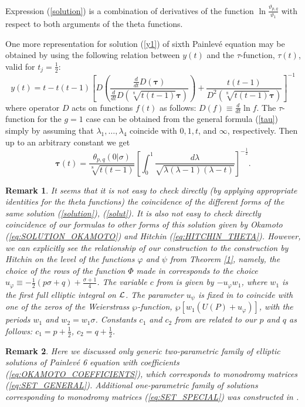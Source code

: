 \documentclass[11pt]{article}
\newtheorem{remark}{Remark}[section]
\def\be{\begin{equation}}
\def\ee{\end{equation}}
\def\ben{\begin{displaymath}}
\def\een{\end{displaymath}}
\def\l{\lambda}
\def\th{\vartheta}
\def\phi{\varphi}
\def\la{\label}
\def\f{\frac}
\def\L{{\cal L}}
\def\log{\ln}
\begin{document}
Expression (\ref{solution}) is a combination of derivatives of the function
$\log\f{\th_{p,q}}{\th_1}$ with respect to both arguments of the theta functions.

One more representation for solution (\ref{y1}) of sixth Painlev\'e equation may be obtained by using the following relation between $y(t)$ and the $\tau$-function, $\tau(t)$, valid for $t_j=\f12$:
\be
  y(t)=t-t(t-1)\left[D\left(\frac{\frac d{dt}D(\mathbf{\tau})}
  {\frac d{dt}D\left(\sqrt[8]{t(t-1)}\mathbf{\tau}\right)}\right)
+\frac{t(t-1)}{D^2\left(\sqrt[8]{t(t-1)}\mathbf{\tau}\right)}\right]^{-1}
\la{solut}
\ee
where operator $D$ acts on functions $f(t)$ as follows:
$D(f)\equiv\f{d}{dt}\log f$.
The $\tau$-function for the $g=1$ case can be obtained from the general formula
(\ref{tau}) simply by assuming that $\l_1,\dots,\l_4$ coincide with $0,1,t$, and $\infty$, respectively. Then up to an arbitrary constant we get
\ben
\mathbf{\tau}(t)=\f{\theta_{p,q}(0\vert\sigma)}{\sqrt[8]{t(t-1)}}
\left[\int_0^1\f{d\l}{\sqrt{\l(\l-1)(\l-t)}}\right]^{-\f12}.
\een
\begin{remark}\rm 
It seems that it is not easy to check directly (by applying appropriate identities for the theta functions) the coincidence of the different forms of the same solution
(\ref{solution}), (\ref{solut}). 
It is also not easy to check directly coincidence of our formulas to
other forms of this solution 
given by Okamoto (\ref{eq:SOLUTION_OKAMOTO})  and  Hitchin
(\ref{eq:HITCHIN_THETA}). However, we can explicitly see the relationship of our construction to the construction by Hitchin on the level of the functions $\phi$ and $\psi$ from Theorem \ref{1}, namely, the choice of the rows of the function $\Phi$ made in \cite{H} corresponds to the choice
$u_\phi\equiv-\f{1}{2}(p\sigma+q)+\f{\sigma+1}{4}$. The variable $c$ from \cite{H} is given by $-u_\phi w_1$, where $w_1$ is the first full elliptic integral on $\L$. The parameter $u_\psi$ is fixed in \cite{H} to coincide with one of the zeros of the 
Weierstrass $\wp$-function, $\wp[w_1(U(P)+ u_\phi)]$, with the periods $w_1$ and $w_2=w_1\sigma$.
Constants $c_1$ and $c_2$ from \cite{H} are related to our $p$ and $q$ as follows: $c_1=p+\f{1}{2}$, $c_2=q+\f{1}{2}$.
\end{remark}

\begin{remark}\rm
Here we discussed only generic two-parametric family of elliptic
solutions of Painlev\'e 6 equation with coefficients 
(\ref{eq:OKAMOTO_COEFFICIENTS}), which corresponds to monodromy matrices
(\ref{eq:SET_GENERAL}). Additional one-parametric family of solutions corresponding to monodromy matrices (\ref{eq:SET_SPECIAL}) was constructed in \cite{H}.
\end{remark}
\end{document}
